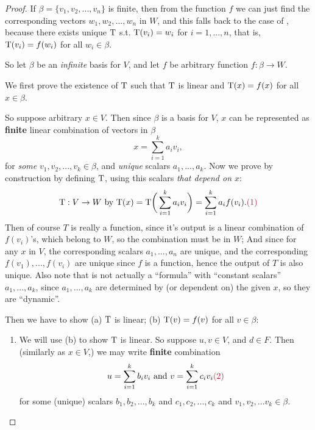\begin{proof}
If \(\beta = \{ v_1, v_2, ..., v_n \}\) is finite, then from the function \(f\) we can just find the corresponding vectors \(w_1, w_2, ..., w_n\) in \(W\),
and this falls back to the case of , because there exists unique \LTRAN{} \(\mathrm{T}\) s.t. \(\mathrm{T}(v_i) = w_i\) for \(i = 1, ..., n\),
that is, \(\mathrm{T}(v_i) = f(w_i)\) for all \(w_i \in \beta\).

So let \(\beta\) be an \emph{infinite} basis for \(V\), and let \(f\) be arbitrary function \(f: \beta \to W\).

We first prove the existence of \(\mathrm{T}\) such that \(\mathrm{T}\) is linear and \(\mathrm{T}(x) = f(x)\) for all \(x \in \beta\).

So suppose arbitrary \(x \in V\).
Then since \(\beta\) is a basis for \(V\), \(x\) can be represented as \textbf{finite} linear combination of vectors in \(\beta\)
\[
    x = \sum_{i = 1}^k a_i v_i,
\]
for \emph{some} \(v_1, v_2, ..., v_k \in \beta\), and \emph{unique} scalars \(a_1, ..., a_k\).
Now we prove by construction by defining \(\mathrm{T}\), using this scalars \emph{that depend on \(x\)}:
\[
    \T : V \to W \text{ by } \T(x) = \T\bigg(\sum_{i = 1}^k a_i v_i\bigg) = \sum_{i = 1}^k a_i f(v_i). \MAROON{(1)}
\]
Then of course \(T\) is really a function, since
 it's output is a linear combination of \(f(v_i)\)'s, which belong to \(W\), so the combination must be in \(W\);
 And since for any \(x\) in \(V\), the corresponding scalars \(a_1, ..., a_n\) are unique, and the corresponding \(f(v_1), ..., f(v_i)\) are unique since \(f\) is a function, hence the output of \(T\) is also unique.
Also note that  is not actually a ``formula'' with ``constant scalars'' \(a_1, ..., a_k\), since \(a_1, ..., a_k\) are determined by (or dependent on) the given \(x\), so they are ``dynamic''.

Then we have to show (a) \(\mathrm{T}\) is linear; (b) \(\mathrm{T}(v) = f(v)\) for all \(v \in \beta\):
\begin{enumerate}
\item
We will use (b) to show \(\mathrm{T}\) is linear.
So suppose \(u, v \in V\), and \(d \in F\).
Then (similarly as \(x \in V\),) we may write \textbf{finite} combination
\[
    u = \sum_{i = 1}^{k} b_i v_i \text{ and } v = \sum_{i = 1}^{k} c_i v_i \MAROON{(2)}
\]
for some (unique) scalars \(b_1, b_2, ..., b_k\) and \(c_1, c_2, ..., c_k\) and \(v_1, v_2, ... v_k \in \beta\).


\end{enumerate}
\end{proof}
